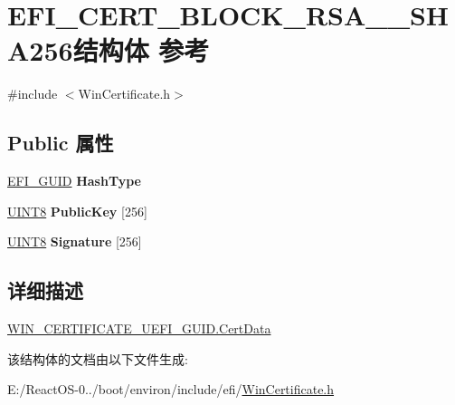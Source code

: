 \hypertarget{struct_e_f_i___c_e_r_t___b_l_o_c_k___r_s_a__2048___s_h_a256}{}\section{E\+F\+I\+\_\+\+C\+E\+R\+T\+\_\+\+B\+L\+O\+C\+K\+\_\+\+R\+S\+A\+\_\+\_\+\+S\+H\+A256结构体 参考}
\label{struct_e_f_i___c_e_r_t___b_l_o_c_k___r_s_a__2048___s_h_a256}


{\ttfamily \#include $<$Win\+Certificate.\+h$>$}

\subsection*{Public 属性}
\begin{DoxyCompactItemize}
\item 
\mbox{\label{struct_e_f_i___c_e_r_t___b_l_o_c_k___r_s_a__2048___s_h_a256_af2b5b0263bbac8e0052127c04260b979}} 
\hyperlink{_uefi_base_type_8h_ad87614428813f71edb2c2d802e9ce2af}{E\+F\+I\+\_\+\+G\+U\+ID} {\bfseries Hash\+Type}
\item 
\mbox{\label{struct_e_f_i___c_e_r_t___b_l_o_c_k___r_s_a__2048___s_h_a256_af05b07f910d96984d3c21e78bb8b875c}} 
\hyperlink{_processor_bind_8h_ab27e9918b538ce9d8ca692479b375b6a}{U\+I\+N\+T8} {\bfseries Public\+Key} \mbox{[}256\mbox{]}
\item 
\mbox{\label{struct_e_f_i___c_e_r_t___b_l_o_c_k___r_s_a__2048___s_h_a256_a8a3c8fd8c177d1c589ec0865f546421b}} 
\hyperlink{_processor_bind_8h_ab27e9918b538ce9d8ca692479b375b6a}{U\+I\+N\+T8} {\bfseries Signature} \mbox{[}256\mbox{]}
\end{DoxyCompactItemize}


\subsection{详细描述}
\hyperlink{struct_w_i_n___c_e_r_t_i_f_i_c_a_t_e___u_e_f_i___g_u_i_d_a83f456b4e18459e7bb882c05941e6653}{W\+I\+N\+\_\+\+C\+E\+R\+T\+I\+F\+I\+C\+A\+T\+E\+\_\+\+U\+E\+F\+I\+\_\+\+G\+U\+I\+D.\+Cert\+Data} 

该结构体的文档由以下文件生成\+:\begin{DoxyCompactItemize}
\item 
E\+:/\+React\+O\+S-\/0../boot/environ/include/efi/\hyperlink{_win_certificate_8h}{Win\+Certificate.\+h}\end{DoxyCompactItemize}
